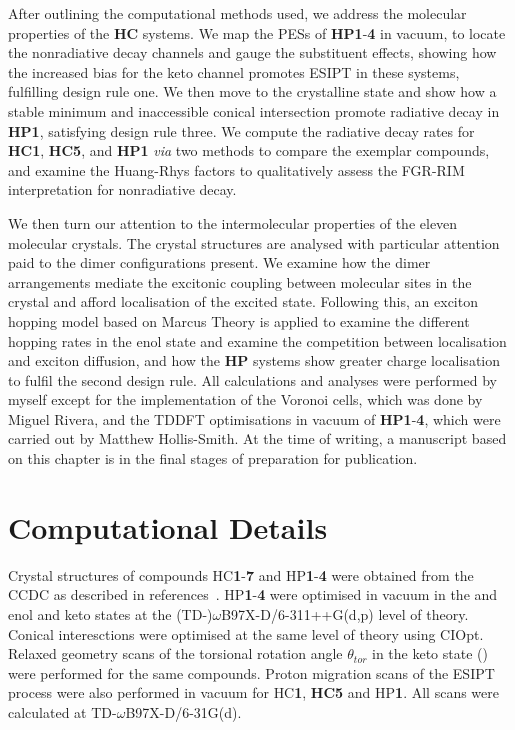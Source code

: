 After outlining the computational methods used, we address the molecular properties of the \textbf{HC} systems. We map the \acp{PES} of \textbf{HP1}-\textbf{4} in vacuum, to locate the nonradiative decay channels and gauge the substituent effects, showing how the increased bias for the keto channel promotes \ac{ESIPT} in these systems, fulfilling design rule one. We then move to the crystalline state and show how a stable \Kstar{} minimum and inaccessible conical intersection promote radiative decay in \textbf{HP1}, satisfying design rule three. We compute the radiative decay rates for \textbf{HC1}, \textbf{HC5}, and \textbf{HP1} \textit{via} two methods to compare the exemplar compounds, and examine the Huang-Rhys factors to qualitatively assess the \ac{FGR-RIM} interpretation for nonradiative decay.

We then turn our attention to the intermolecular properties of the eleven molecular crystals. The crystal structures are analysed with particular attention paid to the dimer configurations present. We examine how the dimer arrangements mediate the excitonic coupling between molecular sites in the crystal and afford localisation of the excited state. Following this, an exciton hopping model based on Marcus Theory is applied to examine the different hopping rates in the enol state and examine the competition between localisation and exciton diffusion, and how the \textbf{HP} systems show greater charge localisation to fulfil the second design rule.  All calculations and analyses were performed by myself except for the implementation of the Voronoi cells, which was done by Miguel Rivera, and the TDDFT optimisations in vacuum of \textbf{HP1}-\textbf{4}, which were carried out by Matthew Hollis-Smith. At the time of writing, a manuscript based on this chapter is in the final stages of preparation for publication.

\section{Computational Details}\label{section: Connecting_Comp}
Crystal structures of compounds \ac{HC}\textbf{1}-\textbf{7} and \ac{HP}\textbf{1}-\textbf{4} were obtained from the CCDC as described in references{~}. \ac{HP}\textbf{1}-\textbf{4} were optimised in vacuum in the \szero{} and \sone{} enol and keto states at the (TD-)$\omega$B97X-D/6-311++G(d,p) level of theory. Conical interesctions were optimised at the same level of theory using CIOpt. Relaxed geometry scans of the torsional rotation angle $\theta_{tor}$ in the keto \sone{} state (\Kstar) were performed for the same compounds. Proton migration scans of the ESIPT process were also performed in vacuum for \ac{HC}\textbf{1}, \textbf{HC5} and \ac{HP}\textbf{1}. All scans were calculated at TD-$\omega$B97X-D/6-31G(d). 


